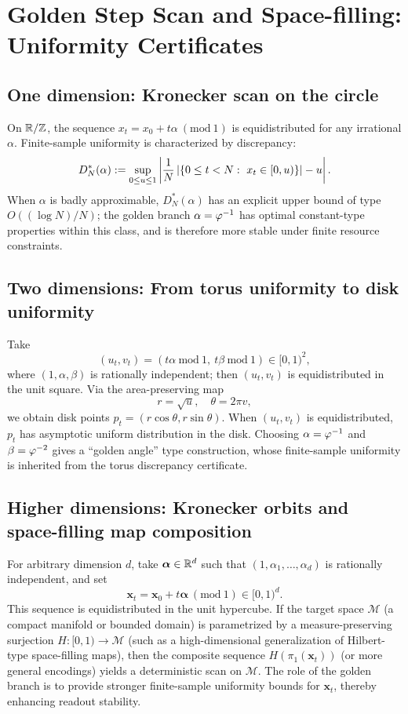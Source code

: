 \section{Golden Step Scan and Space-filling: Uniformity Certificates}

\subsection{One dimension: Kronecker scan on the circle}

On $\mathbb{R}/\mathbb{Z}$, the sequence $x_t=x_0+t\alpha\ (\mathrm{mod}\ 1)$ is equidistributed for any irrational $\alpha$. Finite-sample uniformity is characterized by discrepancy:
\[
D_N^*(\alpha):=\sup_{0\le u\le 1}\left|\frac{1}{N}\card{\{0\le t<N:\ x_t\in[0,u)\}}-u\right|.
\]
When $\alpha$ is badly approximable, $D_N^*(\alpha)$ has an explicit upper bound of type $O((\log N)/N)$; the golden branch $\alpha=\varphi^{-1}$ has optimal constant-type properties within this class, and is therefore more stable under finite resource constraints.

\subsection{Two dimensions: From torus uniformity to disk uniformity}

Take
\[
(u_t,v_t)=(t\alpha\ \mathrm{mod}\ 1,\ t\beta\ \mathrm{mod}\ 1)\in[0,1)^2,
\]
where $(1,\alpha,\beta)$ is rationally independent; then $(u_t,v_t)$ is equidistributed in the unit square. Via the area-preserving map
\[
r=\sqrt{u},\quad \theta=2\pi v,
\]
we obtain disk points $p_t=(r\cos\theta,r\sin\theta)$. When $(u_t,v_t)$ is equidistributed, $p_t$ has asymptotic uniform distribution in the disk. Choosing $\alpha=\varphi^{-1}$ and $\beta=\varphi^{-2}$ gives a ``golden angle'' type construction, whose finite-sample uniformity is inherited from the torus discrepancy certificate.

\subsection{Higher dimensions: Kronecker orbits and space-filling map composition}

For arbitrary dimension $d$, take $\boldsymbol\alpha\in\mathbb{R}^d$ such that $(1,\alpha_1,\dots,\alpha_d)$ is rationally independent, and set
\[
\boldsymbol x_t=\boldsymbol x_0+t\boldsymbol\alpha\ (\mathrm{mod}\ 1)\in[0,1)^d.
\]
This sequence is equidistributed in the unit hypercube. If the target space $\mathcal M$ (a compact manifold or bounded domain) is parametrized by a measure-preserving surjection $H:[0,1)\to\mathcal M$ (such as a high-dimensional generalization of Hilbert-type space-filling maps), then the composite sequence $H(\pi_1(\boldsymbol x_t))$ (or more general encodings) yields a deterministic scan on $\mathcal M$. The role of the golden branch is to provide stronger finite-sample uniformity bounds for $\boldsymbol x_t$, thereby enhancing readout stability.
